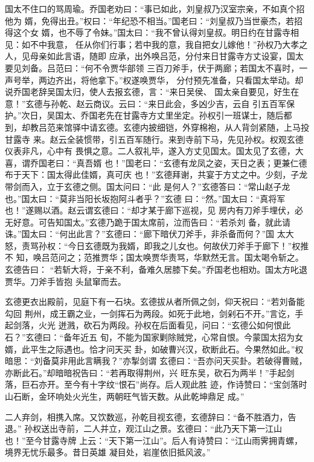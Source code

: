 国太不住口的骂周瑜。乔国老劝曰：“事已如此，刘皇叔乃汉室宗亲，不如真个招他为
婿，免得出丑。”权曰：“年纪恐不相当。”国老曰：“刘皇叔乃当世豪杰，若招得这个女
婿，也不辱了令妹。”国太曰：“我不曾认得刘皇叔。明日约在甘露寺相见：如不中我意，
任从你们行事；若中我的意，我自把女儿嫁他！”孙权乃大孝之人，见母亲如此言语，随即
应承，出外唤吕范，分付来日甘露寺方丈设宴，国太要见刘备。吕范曰：“何不令贾华部领
三百刀斧手，伏于两廊；若国太不喜时，一声号举，两边齐出，将他拿下。”权遂唤贾华，
分付预先准备，只看国太举动。却说乔国老辞吴国太归，使人去报玄德，言：“来日吴侯、
国太亲自要见，好生在意！”玄德与孙乾、赵云商议。云曰：“来日此会，多凶少吉，云自
引五百军保护。”次日，吴国太、乔国老先在甘露寺方丈里坐定。孙权引一班谋士，随后都
到，却教吕范来馆驿中请玄德。玄德内披细铠，外穿棉袍，从人背剑紧随，上马投甘露寺
来。赵云全装惯带，引五百军随行。来到寺前下马，先见孙权。权观玄德仪表非凡，心中有
畏惧之意。二人叙礼毕，遂入方丈见国太。国太见了玄德，大喜，谓乔国老曰：“真吾婿
也！”国老曰：“玄德有龙凤之姿，天日之表；更兼仁德布于天下：国太得此佳婿，真可庆
也！”玄德拜谢，共宴于方丈之中。少刻，子龙带剑而入，立于玄德之侧。国太问曰：“此
是何人？”玄德答曰：“常山赵子龙也。”国太曰：“莫非当阳长坂抱阿斗者乎？”玄德
曰：“然。”国太曰：“真将军也！”遂赐以酒。赵云谓玄德曰：“却才某于廊下巡视，见
房内有刀斧手埋伏，必无好意。可告知国太。”玄德乃跪于国太席前，泣而告曰：“若杀刘
备，就此请诛。”国太曰：“何出此言？”玄德曰：“廊下暗伏刀斧手，非杀备而何？”国
太大怒，责骂孙权：“今日玄德既为我婿，即我之儿女也。何故伏刀斧手于廊下！”权推不
知，唤吕范问之；范推贾华；国太唤贾华责骂，华默然无言。国太喝令斩之。玄德告曰：
“若斩大将，于亲不利，备难久居膝下矣。”乔国老也相劝。国太方叱退贾华。刀斧手皆抱
头鼠窜而去。

玄德更衣出殿前，见庭下有一石块。玄德拔从者所佩之剑，仰天祝曰：“若刘备能勾回
荆州，成王霸之业，一剑挥石为两段。如死于此地，剑剁石不开。”言讫，手起剑落，火光
迸溅，砍石为两段。孙权在后面看见，问曰：“玄德公如何恨此石？”玄德曰：“备年近五
旬，不能为国家剿除贼党，心常自恨。今蒙国太招为女婿，此平生之际遇也。恰才问天买
卦，如破曹兴汉，砍断此石。今果然如此。”权暗思：“刘备莫非用此言瞒我？”亦掣剑谓
玄德曰：“吾亦问天买卦。若破得曹贼，亦断此石。”却暗暗祝告曰：“若再取得荆州，兴
旺东吴，砍石为两半！”手起剑落，巨石亦开。至今有十字纹“恨石”尚存。后人观此胜
迹，作诗赞曰：“宝剑落时山石断，金环响处火光生，两朝旺气皆天数。从此乾坤鼎足
成。”

二人弃剑，相携入席。又饮数巡，孙乾目视玄德，玄德辞曰：“备不胜酒力，告退。”
孙权送出寺前，二人并立，观江山之景。玄德曰：“此乃天下第一江山也！”至今甘露寺牌
上云：“天下第一江山”。后人有诗赞曰：“江山雨霁拥青螺，境界无忧乐最多。昔日英雄
凝目处，岩崖依旧抵风波。”

